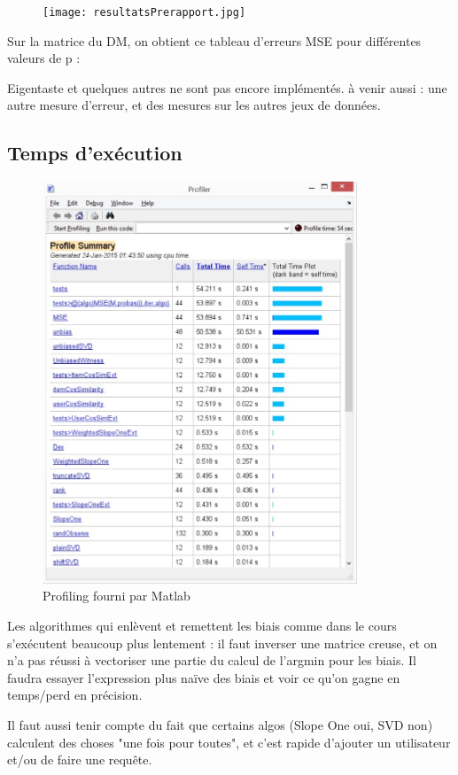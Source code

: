 \documentclass[11pt, openany, a4paper]{article}
\begin{document}
		\begin{figure}[ht!]
			\centering
			\texttt{[image: resultatsPrerapport.jpg]}
		\end{figure}
		Sur la matrice du DM, on obtient ce tableau d'erreurs MSE pour différentes valeurs de p :
		
		Eigentaste et quelques autres ne sont pas encore implémentés.
		à venir aussi : une autre mesure d'erreur, et des mesures sur les autres jeux de données.
		
	\subsection{Temps d'exécution}
	
		\begin{figure}[ht!]
			\centering
			\includegraphics[height=120mm]{times.jpg}
			\caption{Profiling fourni par Matlab}
		\end{figure}
		

		Les algorithmes qui enlèvent et remettent les biais comme dans le cours s'exécutent beaucoup plus lentement : il faut inverser une matrice creuse, et on n'a pas réussi à vectoriser une partie du calcul de l'argmin pour les biais. Il faudra essayer l'expression plus naïve des biais et voir ce qu'on gagne en temps/perd en précision.
		
		Il faut aussi tenir compte du fait que certains algos (Slope One oui, SVD non) calculent des choses "une fois pour toutes", et c'est rapide d'ajouter un utilisateur et/ou de faire une requête.
		


\end{document}

